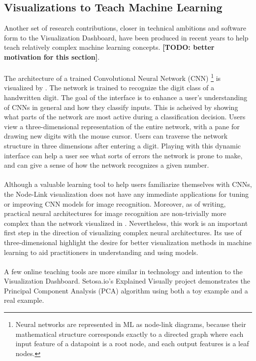 \documentclass{sigchi}
\begin{document}
\subsection{Visualizations to Teach Machine Learning}
%
Another set of research contributions, closer in technical ambitions and software form to the Visualization Dashboard, have been produced in recent years to help teach relatively complex machine learning concepts. \textbf{[TODO: better motivation for this section]}. %
\\\\%
%
The architecture of a trained Convolutional Neural Network (CNN)%
\footnote{Neural networks are represented in ML as node-link diagrams, because their mathematical structure corresponds exactly to a directed graph where each input feature of a datapoint is a root node, and each output features is a leaf nodes.} %
%
is visualized by \cite{harley2015interactive}. %
%
The network is trained to recognize the digit class of a handwritten digit. %
%
The goal of the interface is to enhance a user's understanding of CNNs in general and how they classify inputs. %
%
This is acheived by showing what parts of the network are most active during a classification decision. %
%
Users view a three-dimensional representation of the entire network, with a pane for drawing new digits with the mouse cursor. %
%
Users can traverse the network structure in three dimensions after entering a digit. %
%
Playing with this dynamic interface can help a user see what sorts of errors the network is prone to make, and can give a sense of how the network recognizes a given number. %
%
\\\\
%
Although a valuable learning tool to help users familiarize themselves with CNNs, the Node-Link visualization does not have any immediate applications for tuning or improving CNN models for image recognition. %
%
Moreover, as of writing, practical neural architectures for image recognition are non-trivially more complex than the network visualized in \cite{harley2015interactive}. %
%
Nevertheless, this work is an important first step in the direction of visualizing complex neural architectures. %
%
Its use of three-dimensional  highlight the desire for better visualization methods in machine learning to aid practitioners in understanding and using models.%
%
\\\\
%
A few online teaching tools are more similar in technology and intention to the Visualization Dashboard. %
%
Setosa.io's Explained Visually project demonstrates the Principal Component Analysis (PCA) algorithm \cite{setosaPCA} using both a toy example and a real example. %
\end{document}
